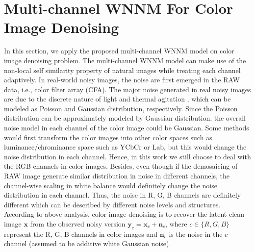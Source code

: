 \documentclass[10pt,twocolumn,letterpaper]{article}
\begin{document}
\section{Multi-channel WNNM For Color Image Denoising}
In this section, we apply the proposed multi-channel WNNM model on color image denoising problem. The multi-channel WNNM model can make use of the non-local self similarity property of natural images while treating each channel adaptively. In real-world noisy images, the noise are first emerged in the RAW data, i.e., color filter array (CFA). The major noise generated in real noisy images are due to the discrete nature of light and thermal agitation \cite{}, which can be modeled as Poisson and Gaussian distribution, respectively. Since the Poisson distribution can be approximately modeled by Gaussian distribution, the overall noise model in each channel of the color image could be Gaussian. Some methods would first transform the color images into other color spaces such as luminance/chrominance space such as YCbCr or Lab, but this would change the noise distribution in each channel. Hence, in this work we still choose to deal with the RGB channels in color images. Besides, even though if the demosaicing of RAW image generate similar distribution in noise in different channels, the channel-wise scaling in white balance would definitely change the noise distribution in each channel. Thus, the noise in R, G, B channels are definitely different which can be described by different noise levels and structures. According to above analysis, color image denoising is to recover the latent clean image $\mathbf{x}$ from the observed noisy version $\mathbf{y}_{c}=\mathbf{x}_{c}+\mathbf{n}_{c}$, where $c\in \{R, G, B\}$ represent the R, G, B channels in color images and $\mathbf{n}_{c}$ is the noise in the $c$ channel 
(assumed to be additive white Gaussian noise).
\end{document}
